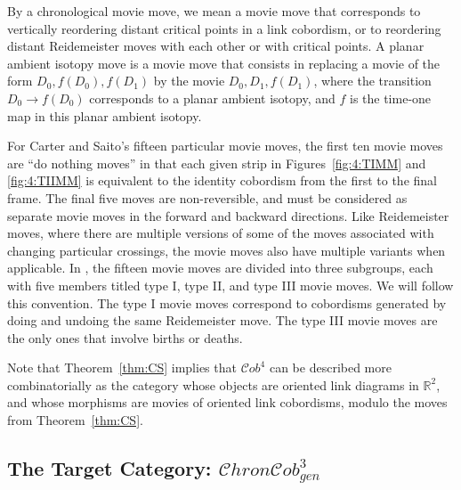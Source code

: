 \documentclass[12pt]{amsart}
\theoremstyle{definition}
\theoremstyle{plain}
\newcommand{\cobIV}{\mathcal{C}ob^4}
\newcommand{\cobIIIgen}{\mathcal{C}hron\mathcal{C}ob^3_{gen}}
\begin{document}
By a chronological movie move, we mean a movie move that corresponds to vertically reordering
distant critical points in a link cobordism, or to reordering distant Reidemeister moves with each other
or with critical points. A planar ambient isotopy move is a movie move that consists in replacing
 a movie of the form $D_0, f(D_0), f(D_1)$ by the movie $D_0, D_1, f(D_1)$, where
 the transition $D_0\rightarrow f(D_0)$ corresponds to a planar ambient isotopy, and $f$
 is the time-one map in this planar ambient isotopy.

For Carter and Saito's fifteen particular movie moves, the first ten movie moves are \enquote{do nothing moves} in that each given strip in Figures~\ref{fig:4:TIMM} and \ref{fig:4:TIIMM} is equivalent to the identity cobordism from the first to the final frame.  The final five moves are non-reversible, and must be considered as separate movie moves in the forward and backward directions.  Like Reidemeister moves, where there are multiple versions of some of the moves associated with changing particular crossings, the movie moves also have multiple variants when applicable. In \cite{Bn2005}, the fifteen movie moves are divided into three subgroups, each with five members titled type I, type II, and type III movie moves. We will follow this convention.  The type I movie moves correspond to cobordisms generated by doing and undoing the same Reidemeister move. The type III movie moves are the only ones that involve births or deaths.

Note that Theorem~\ref{thm:CS} implies that $\cobIV$ can be described more combinatorially as the category
whose objects are oriented link diagrams in $\mathbb{R}^2$, and whose morphisms are movies of oriented
link cobordisms, modulo the moves from Theorem~\ref{thm:CS}.

\subsection{The Target Category: $\cobIIIgen$}\label{subs:targetcategory}
\end{document}
